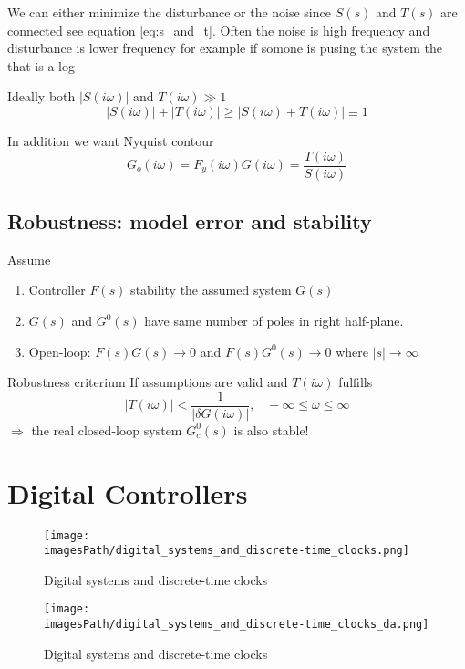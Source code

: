 We can either minimize the disturbance or the noise since $S(s)$ and $T(s)$ are connected
see equation \ref{eq:s_and_t}. Often the noise is high frequency and disturbance is lower
frequency for example if somone is pusing the system the that is a log

Ideally both $|S(i\omega)|$ and $T(i\omega) \gg 1$ 
\begin{equation*}
    |S(i\omega)| + |T(i\omega)| \geq |S(i\omega) + T(i\omega)| \equiv 1
\end{equation*}

In addition we want Nyquist contour
\begin{equation*}
    G_o(i\omega) = F_y(i\omega)G(i\omega) = \frac{T(i\omega)}{S(i\omega)}
\end{equation*}

\subsection{Robustness: model error and stability}
Assume
\begin{enumerate}
    \item Controller $F(s)$ stability the assumed system $G(s)$
    \item $G(s)$ and $G^0(s)$ have same number of poles in right half-plane.
    \item Open-loop: $F(s)G(s)\to0$ and $F(s)G^0(s)\to0$ where $|s|\to\infty$
\end{enumerate}

Robustness criterium 
If assumptions are valid and $T(i\omega)$ fulfills
\begin{equation*}
    |T(i\omega)| < \frac{1}{|\delta G(i\omega)|}, \;\;\; -\infty\leq\omega\leq\infty
\end{equation*}
$\Rightarrow$ the real closed-loop system $G^0_c(s)$ is also stable!


\section{Digital Controllers}
\begin{figure}[!h]
    \centering
    \texttt{[image: \\imagesPath/digital\_systems\_and\_discrete-time\_clocks.png]}
    \caption{Digital systems and discrete-time clocks}
\end{figure}

\begin{figure}[!h]
    \centering
    \texttt{[image: \\imagesPath/digital\_systems\_and\_discrete-time\_clocks\_da.png]}
    \caption{Digital systems and discrete-time clocks}
\end{figure}

